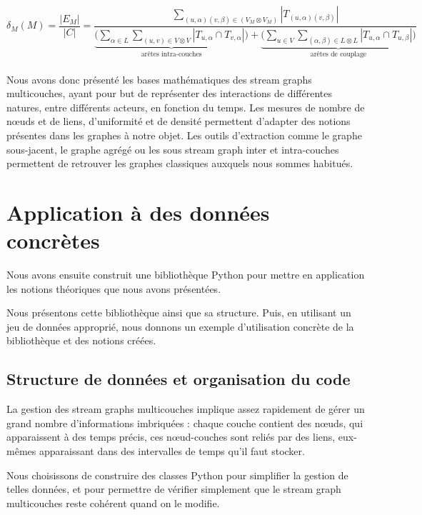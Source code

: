 \documentclass[11pt,a4paper]{article}
\theoremstyle{definition}
\theoremstyle{remark}
\theoremstyle{remark}
\def \stg {stream graph}
\def \stgm {stream graph multicouches}
\def \stgms {stream graphs multicouches}
\begin{document}
	\[
		\delta_M (M) = 
		\frac{|E_M|}{|C|}= 
		\frac{\sum_{(u,\alpha)(v,\beta) \in (V_M \otimes V_M)} |T_{(u,\alpha)(v,\beta)}|}
		{\underbrace{\bigg(\sum_{\alpha \in L}\sum_{(u,v) \in V\otimes V}|T_{u,\alpha} \cap T_{v,\alpha}|\bigg)}_{\text{arêtes intra-couches}}+\underbrace{\bigg( \sum_{u \in V } \sum_{(\alpha,\beta) \in L \otimes L}|T_{u,\alpha}\cap T_{u,\beta}|\bigg)}_{\text{arêtes de couplage}}}
	\]


\paragraph{}
Nous avons donc présenté les bases mathématiques des \stgms{}, ayant pour but de représenter des interactions de différentes natures, entre différents acteurs, en fonction du temps. Les mesures de nombre de n\oe{}uds et de liens, d'uniformité et de densité permettent d'adapter des notions présentes dans les graphes à notre objet. Les outils d'extraction comme le graphe sous-jacent, le graphe agrégé ou les sous \stg{} inter et intra-couches permettent de \og retrouver \fg{} les graphes classiques auxquels nous sommes habitués.
	
\section{Application à des données concrètes}
\label{application}

Nous avons ensuite construit une bibliothèque Python \cite{github} pour mettre en application les notions théoriques que nous avons présentées.

Nous présentons cette bibliothèque ainsi que sa structure. Puis, en utilisant un jeu de données approprié, nous donnons un exemple d'utilisation concrète de la bibliothèque et des notions créées.


\subsection{Structure de données et organisation du code} 

\label{descode}

	La gestion des \stgms{} implique assez rapidement de gérer un grand nombre d'informations \og imbriquées \fg{}: chaque couche contient des n\oe{}uds, qui apparaissent à des temps précis, ces n\oe{}ud-couches sont reliés par des liens, eux-mêmes apparaissant dans des intervalles de temps qu'il faut stocker.
	
	Nous choisissons de construire des classes Python pour simplifier la gestion de telles données, et pour permettre de vérifier simplement que le \stgm{} reste cohérent quand on le modifie.
	
\end{document}
